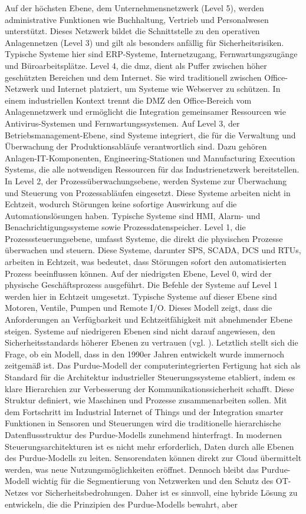\noindent Auf der höchsten Ebene, dem Unternehmensnetzwerk (Level 5), werden administrative Funktionen wie Buchhaltung, Vertrieb und Personalwesen unterstützt. Dieses Netzwerk bildet die Schnittstelle zu den operativen Anlagennetzen (Level 3) und gilt als besonders anfällig für Sicherheitsrisiken. Typische Systeme hier sind ERP-Systeme, Internetzugang, Fernwartungszugänge und Büroarbeitsplätze. Level 4, die \ac{dmz}, dient als Puffer zwischen höher geschützten Bereichen und dem Internet. Sie wird traditionell zwischen Office-Netzwerk und Internet platziert, um Systeme wie Webserver zu schützen. In einem industriellen Kontext trennt die DMZ den Office-Bereich vom Anlagennetzwerk und ermöglicht die Integration gemeinsamer Ressourcen wie Antivirus-Systemen und Fernwartungssystemen. Auf Level 3, der Betriebsmanagement-Ebene, sind Systeme integriert, die für die Verwaltung und Überwachung der Produktionsabläufe verantwortlich sind. Dazu gehören Anlagen-IT-Komponenten, Engineering-Stationen und Manufacturing Execution Systems, die alle notwendigen Ressourcen für das Industrienetzwerk bereitstellen. In Level 2, der Prozessüberwachungsebene, werden Systeme zur Überwachung und Steuerung von Prozessabläufen eingesetzt. Diese Systeme arbeiten nicht in Echtzeit, wodurch Störungen keine sofortige Auswirkung auf die Automationslösungen haben. \clearpage \noindent Typische Systeme sind HMI, Alarm- und Benachrichtigungssysteme sowie Prozessdatenspeicher. Level 1, die Prozesssteuerungsebene, umfasst Systeme, die direkt die physischen Prozesse überwachen und steuern. Diese Systeme, darunter SPS, SCADA, DCS und RTUs, arbeiten in Echtzeit, was bedeutet, dass Störungen sofort den automatisierten Prozess beeinflussen können. Auf der niedrigsten Ebene, Level 0, wird der physische Geschäftsprozess ausgeführt. Die Befehle der Systeme auf Level 1 werden hier in Echtzeit umgesetzt. Typische Systeme auf dieser Ebene sind Motoren, Ventile, Pumpen und Remote I/O. Dieses Modell zeigt, dass die Anforderungen an Verfügbarkeit und Echtzeitfähigkeit mit abnehmender Ebene steigen. Systeme auf niedrigeren Ebenen sind nicht darauf angewiesen, den Sicherheitsstandards höherer Ebenen zu vertrauen (vgl. \cite{sichereIndustrie2}). Letztlich stellt sich die Frage, ob ein Modell, dass in den 1990er Jahren entwickelt wurde immernoch zeitgemäß ist. Das Purdue-Modell der computerintegrierten Fertigung hat sich als Standard für die Architektur industrieller Steuerungssysteme etabliert, indem es klare Hierarchien zur Verbesserung der Kommunikationssicherheit schafft. Diese Struktur definiert, wie Maschinen und Prozesse zusammenarbeiten sollen. Mit dem Fortschritt im Industrial Internet of Things und der Integration smarter Funktionen in Sensoren und Steuerungen wird die traditionelle hierarchische Datenflussstruktur des Purdue-Modells zunehmend hinterfragt. In modernen Steuerungsarchitekturen ist es nicht mehr erforderlich, Daten durch alle Ebenen des Purdue-Modells zu leiten. Sensorendaten können direkt zur Cloud übermittelt werden, was neue Nutzungsmöglichkeiten eröffnet. Dennoch bleibt das Purdue-Modell wichtig für die Segmentierung von Netzwerken und den Schutz des OT-Netzes vor Sicherheitsbedrohungen. Daher ist es sinnvoll, eine hybride Lösung zu entwickeln, die die Prinzipien des Purdue-Modells bewahrt, aber 